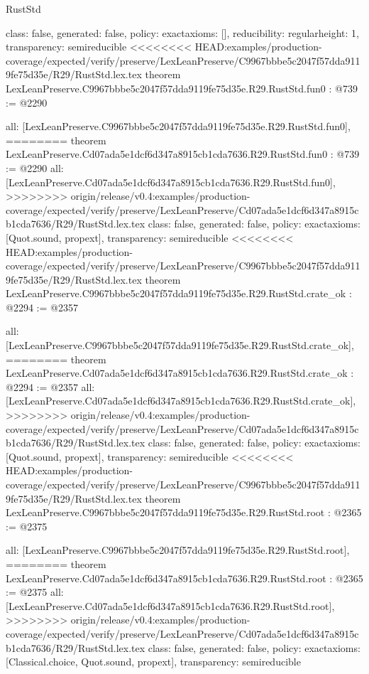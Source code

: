 \begin{lexlean}{RustStd}
\begin{coremodule}
{\begin{coremodule}
{{{  class: false,
  generated: false,
  policy: exact{axioms: []},
  reducibility: regular{height: 1},
  transparency: semireducible
}
<<<<<<<< HEAD:examples/production-coverage/expected/verify/preserve/LexLeanPreserve/C9967bbbe5c2047f57dda9119fe75d35e/R29/RustStd.lex.tex
theorem LexLeanPreserve.C9967bbbe5c2047f57dda9119fe75d35e.R29.RustStd.fun0 : @739 := @2290 {
  all: [LexLeanPreserve.C9967bbbe5c2047f57dda9119fe75d35e.R29.RustStd.fun0],
========
theorem LexLeanPreserve.Cd07ada5e1dcf6d347a8915cb1cda7636.R29.RustStd.fun0 : @739 := @2290 {
  all: [LexLeanPreserve.Cd07ada5e1dcf6d347a8915cb1cda7636.R29.RustStd.fun0],
>>>>>>>> origin/release/v0.4:examples/production-coverage/expected/verify/preserve/LexLeanPreserve/Cd07ada5e1dcf6d347a8915cb1cda7636/R29/RustStd.lex.tex
  class: false,
  generated: false,
  policy: exact{axioms: [Quot.sound, propext]},
  transparency: semireducible
}
<<<<<<<< HEAD:examples/production-coverage/expected/verify/preserve/LexLeanPreserve/C9967bbbe5c2047f57dda9119fe75d35e/R29/RustStd.lex.tex
theorem LexLeanPreserve.C9967bbbe5c2047f57dda9119fe75d35e.R29.RustStd.crate_ok : @2294 := @2357 {
  all: [LexLeanPreserve.C9967bbbe5c2047f57dda9119fe75d35e.R29.RustStd.crate_ok],
========
theorem LexLeanPreserve.Cd07ada5e1dcf6d347a8915cb1cda7636.R29.RustStd.crate_ok : @2294 := @2357 {
  all: [LexLeanPreserve.Cd07ada5e1dcf6d347a8915cb1cda7636.R29.RustStd.crate_ok],
>>>>>>>> origin/release/v0.4:examples/production-coverage/expected/verify/preserve/LexLeanPreserve/Cd07ada5e1dcf6d347a8915cb1cda7636/R29/RustStd.lex.tex
  class: false,
  generated: false,
  policy: exact{axioms: [Quot.sound, propext]},
  transparency: semireducible
}
<<<<<<<< HEAD:examples/production-coverage/expected/verify/preserve/LexLeanPreserve/C9967bbbe5c2047f57dda9119fe75d35e/R29/RustStd.lex.tex
theorem LexLeanPreserve.C9967bbbe5c2047f57dda9119fe75d35e.R29.RustStd.root : @2365 := @2375 {
  all: [LexLeanPreserve.C9967bbbe5c2047f57dda9119fe75d35e.R29.RustStd.root],
========
theorem LexLeanPreserve.Cd07ada5e1dcf6d347a8915cb1cda7636.R29.RustStd.root : @2365 := @2375 {
  all: [LexLeanPreserve.Cd07ada5e1dcf6d347a8915cb1cda7636.R29.RustStd.root],
>>>>>>>> origin/release/v0.4:examples/production-coverage/expected/verify/preserve/LexLeanPreserve/Cd07ada5e1dcf6d347a8915cb1cda7636/R29/RustStd.lex.tex
  class: false,
  generated: false,
  policy: exact{axioms: [Classical.choice, Quot.sound, propext]},
  transparency: semireducible
}

}}}}}
\end{coremodule}}
\end{coremodule}
\end{lexlean}
